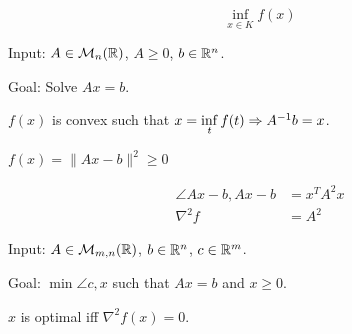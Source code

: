 \[
    \inf\limits_{x\in K} f(x)
\]

\begin{example}
    Input: $A \in \mathcal{M}_n(\mathbb{R})$, $A\geqslant 0$, $b\in\mathbb{R}^n$.
    
    Goal: Solve $Ax=b$.
    
    $f(x)$ is convex such that $x=\inf\limits_{t} f(t) \Rightarrow A^{-1} b = x$.
    
    $f(x) = \lVert Ax-b \rVert^2 \geqslant 0$
    
    \[
        \begin{aligned}
            \angle{Ax-b, Ax-b} &= x^T A^2x\\
            \nabla^2 f &= A^2
        \end{aligned}
    \]
\end{example}

\begin{example}
    Input: $A \in \mathcal{M}_{m,n}(\mathbb{R})$, $b\in\mathbb{R}^n$, $c\in\mathbb{R}^m$.
    
    Goal: $\min\limits \angle{c,x}$ such that $Ax=b$ and $x\geqslant 0$.
\end{example}

\begin{proposition}
    $x$ is optimal iff $\nabla^2f(x) = 0$.
\end{proposition}

